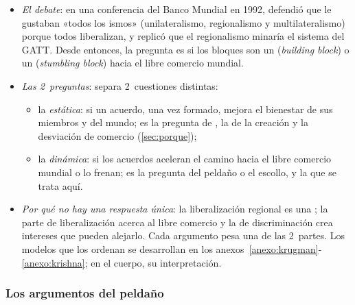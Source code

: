 \documentclass[11pt]{article}
\begin{document}
\begin{itemize}
\item \emph{El debate}: en una conferencia del Banco Mundial en 1992,  defendió que le gustaban «todos los ismos» (unilateralismo, regionalismo y multilateralismo) porque todos liberalizan, y  replicó que el regionalismo minaría el sistema del GATT\nocite{Baldwin2004Stepping,Summers1991}. Desde entonces, la pregunta es si los bloques son un  (\emph{building block}) o un  (\emph{stumbling block}) hacia el libre comercio mundial\nocite{Bhagwati1991World}.
\item \emph{Las 2~preguntas}: \textcite{Bhagwati1993Overview} separa 2~cuestiones distintas:
  \begin{itemize}
  \item la \emph{estática}: si un acuerdo, una vez formado, mejora el bienestar de sus miembros y del mundo; es la pregunta de , la de la creación y la desviación de comercio (\ref{sec:porque});
  \item la \emph{dinámica}: si los acuerdos aceleran el camino hacia el libre comercio mundial o lo frenan; es la pregunta del peldaño o el escollo, y la que se trata aquí.
  \end{itemize}
\item \emph{Por qué no hay una respuesta única}: la liberalización regional es una ; la parte de liberalización acerca al libre comercio y la de discriminación crea intereses que pueden alejarlo. Cada argumento pesa una de las 2~partes. Los modelos que los ordenan se desarrollan en los anexos~\ref{anexo:krugman}-\ref{anexo:krishna}; en el cuerpo, su interpretación.
\end{itemize}

\subsubsection{Los argumentos del peldaño}\label{sec:peldano}
\end{document}
